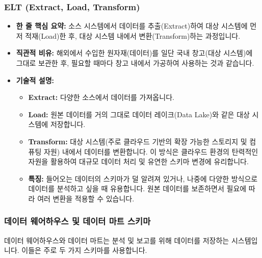 \documentclass[11pt,a4paper]{article}
\theoremstyle{definition}
\begin{document}
\subsubsection{ELT (Extract, Load, Transform)}
\begin{itemize}
    \item \textbf{한 줄 핵심 요약:} 소스 시스템에서 데이터를 추출(Extract)하여 대상 시스템에 먼저 적재(Load)한 후, 대상 시스템 내에서 변환(Transform)하는 과정입니다.
    \item \textbf{직관적 비유:} 해외에서 수입한 원자재(데이터)를 일단 국내 창고(대상 시스템)에 그대로 보관한 후, 필요할 때마다 창고 내에서 가공하여 사용하는 것과 같습니다.
    \item \textbf{기술적 설명:}
    \begin{itemize}
        \item \textbf{Extract:} 다양한 소스에서 데이터를 가져옵니다.
        \item \textbf{Load:} 원본 데이터를 거의 그대로 데이터 레이크(Data Lake)와 같은 대상 시스템에 저장합니다.
        \item \textbf{Transform:} 대상 시스템(주로 클라우드 기반의 확장 가능한 스토리지 및 컴퓨팅 자원) 내에서 데이터를 변환합니다. 이 방식은 클라우드 환경의 탄력적인 자원을 활용하여 대규모 데이터 처리 및 유연한 스키마 변경에 유리합니다.
        \item \textbf{특징:} 들어오는 데이터의 스키마가 덜 알려져 있거나, 나중에 다양한 방식으로 데이터를 분석하고 싶을 때 유용합니다. 원본 데이터를 보존하면서 필요에 따라 여러 변환을 적용할 수 있습니다.
    \end{itemize}
\end{itemize}

\subsubsection{데이터 웨어하우스 및 데이터 마트 스키마}
데이터 웨어하우스와 데이터 마트는 분석 및 보고를 위해 데이터를 저장하는 시스템입니다. 이들은 주로 두 가지 스키마를 사용합니다.
\end{document}
